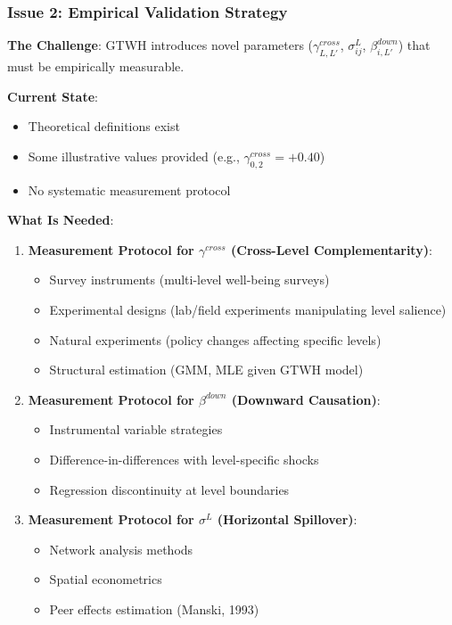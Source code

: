 \subsubsection{Issue 2: Empirical Validation Strategy}

\begin{tcolorbox}[colback=red!5!white, colframe=red!75!black, title=Status: Incomplete]
\textbf{The Challenge}: GTWH introduces novel parameters ($\gamma^{cross}_{L,L'}$, 
$\sigma^L_{ij}$, $\beta^{down}_{i,L'}$) that must be empirically measurable.

\textbf{Current State}: 
\begin{itemize}[nosep]
\item Theoretical definitions exist
\item Some illustrative values provided (e.g., $\gamma^{cross}_{0,2} = +0.40$)
\item No systematic measurement protocol
\end{itemize}

\textbf{What Is Needed}:
\begin{enumerate}
\item \textbf{Measurement Protocol for $\gamma^{cross}$ (Cross-Level Complementarity)}:
    \begin{itemize}[nosep]
    \item Survey instruments (multi-level well-being surveys)
    \item Experimental designs (lab/field experiments manipulating level salience)
    \item Natural experiments (policy changes affecting specific levels)
    \item Structural estimation (GMM, MLE given GTWH model)
    \end{itemize}

\item \textbf{Measurement Protocol for $\beta^{down}$ (Downward Causation)}:
    \begin{itemize}[nosep]
    \item Instrumental variable strategies
    \item Difference-in-differences with level-specific shocks
    \item Regression discontinuity at level boundaries
    \end{itemize}

\item \textbf{Measurement Protocol for $\sigma^L$ (Horizontal Spillover)}:
    \begin{itemize}[nosep]
    \item Network analysis methods
    \item Spatial econometrics
    \item Peer effects estimation (Manski, 1993)
    \end{itemize}


\end{enumerate}
\end{tcolorbox}
